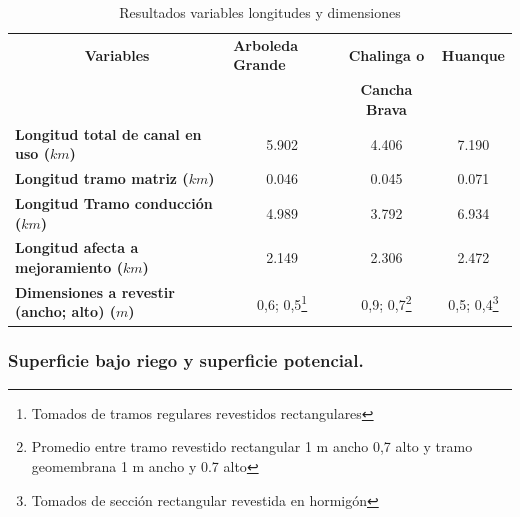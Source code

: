 \documentclass[]{article}
\let\rmarkdownfootnote\footnote%
\def\footnote{\protect\rmarkdownfootnote}
\begin{document}
\begin{longtable}{|l|ccc|}
\caption{Resultados variables longitudes y dimensiones}\\
\hline
\multicolumn{1}{|c|}{\textbf{Variables}}                 & \multicolumn{1}{l}{\textbf{Arboleda Grande}} & \multicolumn{1}{c}{\textbf{Chalinga o}} & \multicolumn{1}{l|}{\textbf{Huanque}} \\
 & & \multicolumn{1}{c}{\textbf{Cancha Brava}} &  \\ \hline                          
\textbf{Longitud total de canal en uso ($km$)}                  & 5.902                                        & 4.406                                                & 7.190                                 \\
\textbf{Longitud tramo matriz ($km$)}                           & 0.046                                        & 0.045                                                & 0.071                                 \\
\textbf{Longitud Tramo conducción ($km$)}                       & 4.989                                        & 3.792                                                & 6.934                                 \\
\textbf{Longitud afecta a mejoramiento ($km$)}       & 2.149                                        & 2.306                                                & 2.472                                 \\
\textbf{Dimensiones a revestir  (ancho; alto) ($m$)} & 0,6; 0,5\footnote{Tomados de tramos regulares revestidos rectangulares}                                    & 0,9; 0,7\footnote{Promedio entre tramo revestido rectangular 1 m ancho 0,7 alto y tramo geomembrana 1 m ancho y 0.7 alto}                                          & 0,5; 0,4\footnote{Tomados de sección rectangular revestida en hormigón }\\ 
\hline
\end{longtable}

\subsubsection{Superficie bajo riego y superficie potencial.}
\end{document}
